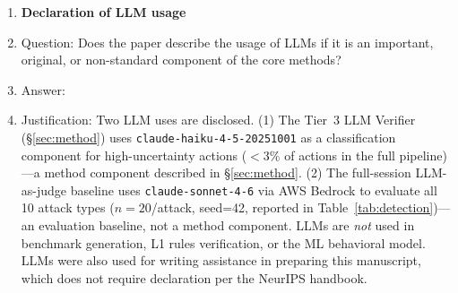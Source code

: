 \begin{enumerate}
\item {\bf Declaration of LLM usage}
    \item[] Question: Does the paper describe the usage of LLMs if it is an important, original, or non-standard component of the core methods?
    \item[] Answer: \answerYes{}
    \item[] Justification: Two LLM uses are disclosed. (1) The Tier~3 LLM Verifier (\S\ref{sec:method}) uses \texttt{claude-haiku-4-5-20251001} as a classification component for high-uncertainty actions ($<3\%$ of actions in the full pipeline)---a method component described in \S\ref{sec:method}. (2) The full-session LLM-as-judge baseline uses \texttt{claude-sonnet-4-6} via AWS Bedrock to evaluate all 10 attack types ($n{=}20$/attack, seed=42, reported in Table~\ref{tab:detection})---an evaluation baseline, not a method component. LLMs are \emph{not} used in benchmark generation, L1 rules verification, or the ML behavioral model. LLMs were also used for writing assistance in preparing this manuscript, which does not require declaration per the NeurIPS handbook.

\end{enumerate}
